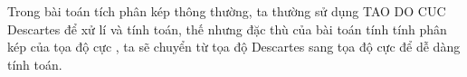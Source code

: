 \documentclass[preview]{standalone}
\begin{document}
\begin{center}
Trong bài toán tích phân kép thông thường, ta thường sử dụng TAO DO CUC Descartes để xử lí và tính toán, thế nhưng đặc thù của bài toán tính tính phân kép của tọa độ cực , ta sẽ chuyển từ tọa độ Descartes sang tọa độ cực để dễ dàng tính toán.
\end{center}
\end{document}
